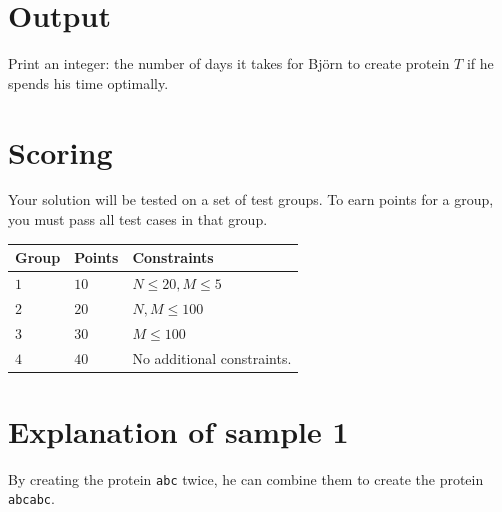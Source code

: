 \section*{Output}
Print an integer: the number of days it takes for Björn to create protein $T$ if he spends his time optimally.

\section*{Scoring}
Your solution will be tested on a set of test groups.
To earn points for a group, you must pass all test cases in that group.


\noindent
\begin{tabular}{| l | l | p{12cm} |}
  \hline
  \textbf{Group} & \textbf{Points} & \textbf{Constraints} \\ \hline
  $1$    & $10$       & $N \leq 20, M \leq 5$ \\ \hline
  $2$    & $20$       & $N, M \leq 100$ \\ \hline
  $3$    & $30$       & $M \leq 100$ \\ \hline
  $4$    & $40$       & No additional constraints. \\ \hline
\end{tabular}

\section*{Explanation of sample 1}
By creating the protein \texttt{abc} twice, he can combine them to create the protein \texttt{abcabc}.
